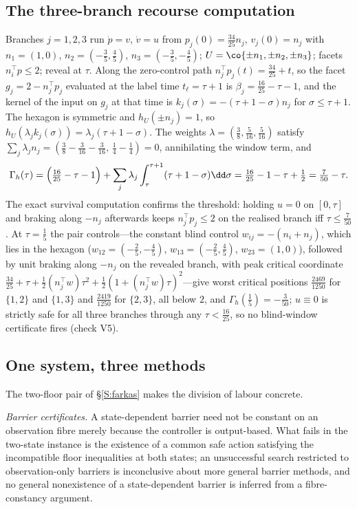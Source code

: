 \subsection{The three-branch recourse computation}\label{S:threebranch}
Branches $j=1,2,3$ run $\dot p=v$, $\dot v=u$ from $p_j(0)=\tfrac{34}{25}n_j$, $v_j(0)=n_j$ with $n_1=(1,0)$, $n_2=(-\tfrac35,\tfrac45)$, $n_3=(-\tfrac35,-\tfrac45)$; $U=\co\{\pm n_1,\pm n_2,\pm n_3\}$; facets $n_i^\top p\le2$; reveal at $\tau$. Along the zero-control path $n_j^\top p_j(t)=\tfrac{34}{25}+t$, so the facet $g_j=2-n_j^\top p_j$ evaluated at the label time $t_\ell=\tau+1$ is $\beta_j=\tfrac{16}{25}-\tau-1$, and the kernel of the input on $g_j$ at that time is $k_j(\sigma)=-(\tau+1-\sigma)n_j$ for $\sigma\le\tau+1$. The hexagon is symmetric and $h_U(\pm n_j)=1$, so $h_U(\lambda_jk_j(\sigma))=\lambda_j(\tau+1-\sigma)$. The weights $\lambda=(\tfrac38,\tfrac5{16},\tfrac5{16})$ satisfy $\sum_j\lambda_jn_j=(\tfrac38-\tfrac3{16}-\tfrac3{16},\,\tfrac14-\tfrac14)=0$, annihilating the window term, and
\[
\Gamma_h(\tau)=\Bigl(\tfrac{16}{25}-\tau-1\Bigr)+\sum_j\lambda_j\int_\tau^{\tau+1}(\tau+1-\sigma)\dd\sigma=\tfrac{16}{25}-1-\tau+\tfrac12=\tfrac7{50}-\tau .
\]
The exact survival computation confirms the threshold: holding $u=0$ on $[0,\tau]$ and braking along $-n_j$ afterwards keeps $n_j^\top p_j\le2$ on the realised branch iff $\tau\le\tfrac7{50}$. At $\tau=\tfrac15$ the pair controls---the constant blind control $w_{ij}=-(n_i+n_j)$, which lies in the hexagon ($w_{12}=(-\tfrac25,-\tfrac45)$, $w_{13}=(-\tfrac25,\tfrac45)$, $w_{23}=(1,0)$), followed by unit braking along $-n_j$ on the revealed branch, with peak critical coordinate $\tfrac{34}{25}+\tau+\tfrac12(n_j^\top w)\tau^2+\tfrac12(1+(n_j^\top w)\tau)^2$---give worst critical positions $\tfrac{2469}{1250}$ for $\{1,2\}$ and $\{1,3\}$ and $\tfrac{2419}{1250}$ for $\{2,3\}$, all below $2$, and $\Gamma_h(\tfrac15)=-\tfrac3{50}$; $u\equiv0$ is strictly safe for all three branches through any $\tau<\tfrac{16}{25}$, so no blind-window certificate fires (check V5).

\subsection{One system, three methods}\label{S:threemethods}
The two-floor pair of \S\ref{S:farkas} makes the division of labour concrete.

\emph{Barrier certificates.} A state-dependent barrier need not be constant on an observation fibre merely because the controller is output-based. What fails in the two-state instance is the existence of a common safe action satisfying the incompatible floor inequalities at both states; an unsuccessful search restricted to observation-only barriers is inconclusive about more general barrier methods, and no general nonexistence of a state-dependent barrier is inferred from a fibre-constancy argument.

